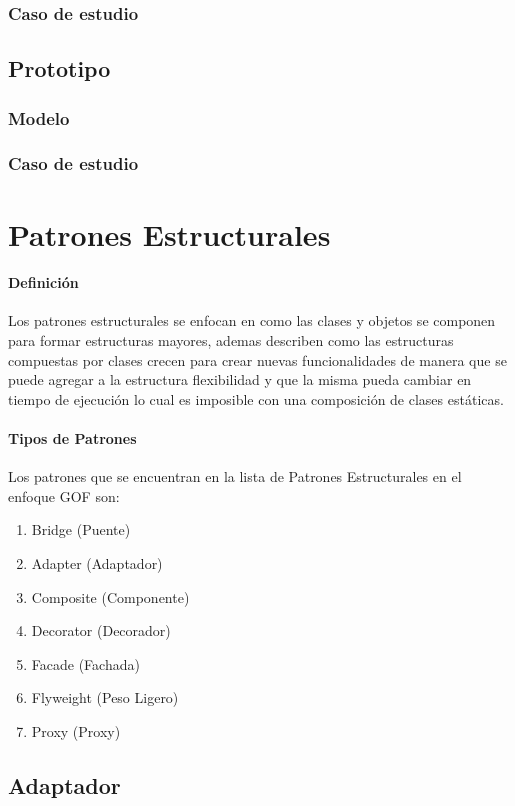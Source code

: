 \subsubsection{Caso de estudio}
\newpage

\subsection{Prototipo}
\subsubsection{Modelo}
\newpage
\subsubsection{Caso de estudio}
\newpage

\section{Patrones Estructurales}
\paragraph{Definición}
Los patrones estructurales se enfocan en como las clases y objetos se componen para formar estructuras mayores, ademas describen como las estructuras compuestas por clases crecen para crear nuevas funcionalidades de manera que se puede agregar a la estructura flexibilidad y que la misma pueda cambiar en tiempo de ejecución lo cual es imposible con una composición de clases estáticas.
\paragraph{Tipos de Patrones}
Los patrones que se encuentran en la lista de Patrones Estructurales en el enfoque GOF son:
\begin{enumerate}
	\item Bridge (Puente)
	\item Adapter (Adaptador)
	\item Composite (Componente)
	\item Decorator (Decorador)
	\item Facade (Fachada)
	\item Flyweight (Peso Ligero) 
	\item Proxy (Proxy)
\end{enumerate}

\subsection{Adaptador}

